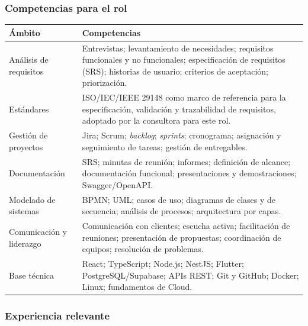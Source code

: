 \subsubsection{Competencias para el rol}

\begin{center}
\begin{tabularx}{\linewidth}{@{}L{4.0cm} Y@{}}
\toprule
\sffamily\bfseries\color{lgPrimario}Ámbito &
\sffamily\bfseries\color{lgPrimario}Competencias \\
\midrule
Análisis de requisitos & Entrevistas; levantamiento de necesidades; requisitos funcionales y no funcionales; especificación de requisitos (SRS); historias de usuario; criterios de aceptación; priorización. \\
Estándares & ISO/IEC/IEEE 29148 como marco de referencia para la especificación, validación y trazabilidad de requisitos, adoptado por la consultora para este rol. \\
Gestión de proyectos & Jira; Scrum; \emph{backlog}; \emph{sprints}; cronograma; asignación y seguimiento de tareas; gestión de entregables. \\
Documentación & SRS; minutas de reunión; informes; definición de alcance; documentación funcional; presentaciones y demostraciones; Swagger/OpenAPI. \\
Modelado de sistemas & BPMN; UML; casos de uso; diagramas de clases y de secuencia; análisis de procesos; arquitectura por capas. \\
Comunicación y liderazgo & Comunicación con clientes; escucha activa; facilitación de reuniones; presentación de propuestas; coordinación de equipos; resolución de problemas. \\
Base técnica & React; TypeScript; Node.js; NestJS; Flutter; PostgreSQL/Supabase; APIs REST; Git y GitHub; Docker; Linux; fundamentos de Cloud. \\
\bottomrule
\end{tabularx}
\end{center}

\subsubsection{Experiencia relevante}

